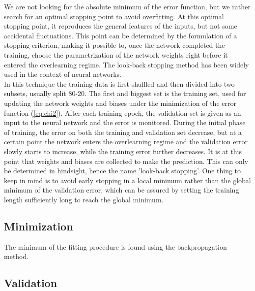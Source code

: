 \documentclass[11pt,a4paper]{article}
\numberwithin{equation}{section}
\numberwithin{figure}{section}
\numberwithin{table}{section}
\begin{document}
We are not looking for the absolute minimum of the error function, but we rather search for an optimal stopping point to avoid overfitting. At this optimal stopping point, it reproduces the general features of the inputs, but not some accidental fluctuations. This point can be determined by the formulation of a stopping criterion, making it possible to, once the network completed the training, choose the parametrization of the network weights right before it entered the overlearning regime. The look-back stopping method has been widely used in the context of neural networks. \\
In this technique the training data is first shuffled and then divided into two subsets, usually split 80-20. The first and biggest set is the training set, used for updating the network weights and biases under the minimization of the error function (\ref{eq:chi2}). After each training epoch, the validation set is given as an input to the neural network and the error is monitored. During the initial phase of training, the error on both the training and validation set decrease, but at a certain point the network enters the overlearning regime and the validation error slowly starts to increase, while the training error further decreases. It is at this point that weights and biases are collected to make the prediction. This can only be determined in hindsight, hence the name 'look-back stopping'. One thing to keep in mind is to avoid early stopping in a local minimum rather than the global minimum of the validation error, which can be assured by setting the training length sufficiently long to reach the global minimum.

\subsection{Minimization}
The minimum of the fitting procedure is found using the backpropagation method. 

\subsection{Validation}
\end{document}
